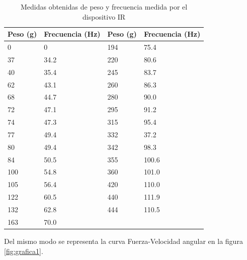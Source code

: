 \documentclass[spanish,12pt,a4paper,titlepage]{report}
\begin{document}
\begin{table}[H]
\centering
\begin{tabular}{|p{80pt}|p{80pt}||p{80pt}|p{80pt}|} 
 \cellcolor[gray]{0.8} \textbf{Peso (g)} & \cellcolor[gray]{0.8} \textbf{Frecuencia (Hz)} & \cellcolor[gray]{0.8} \textbf{Peso (g)} & \cellcolor[gray]{0.8} \textbf{Frecuencia (Hz)}\\ \hline
 
 0  & 0     & 194 & 75.4\\ \hline

37 & 34.2   &  220  & 80.6  \\ \hline

 40  & 35.4   & 245 & 83.7\\ \hline

62 & 43.1 & 260  & 86.3  \\ \hline

 68  & 44.7  & 280 & 90.0\\ \hline

72 & 47.1 & 295  & 91.2  \\ \hline

 74  & 47.3  &315 & 95.4\\ \hline

77 & 49.4 & 332  & 37.2  \\ \hline

 80  & 49.4  & 342 & 98.3\\ \hline

84 & 50.5 & 355 & 100.6\\ \hline

 100  & 54.8  & 360  & 101.0  \\ \hline

105 & 56.4 &420 & 110.0\\ \hline

 122  & 60.5   &440  & 111.9  \\ \hline

132 & 62.8    &444 & 110.5\\ \hline

 163  & 70.0 \\ \hline 

\end{tabular}
\caption{Medidas obtenidas de peso y frecuencia medida por el dispositivo IR}
\label{tab:fuerza-vel}
\end{table}

Del mismo modo se representa la curva Fuerza-Velocidad angular en la figura \ref{fig:grafica1}.
\end{document}
